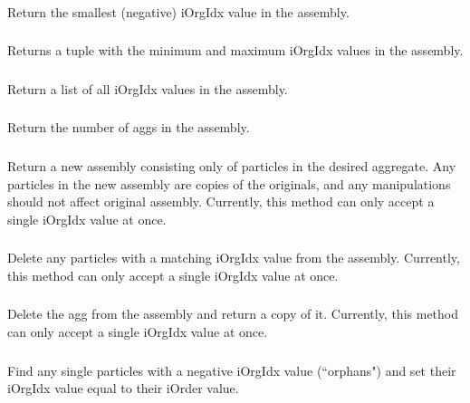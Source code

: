 \subsubsection{}
Return the smallest (negative) iOrgIdx value in the assembly.

\subsubsection{}
Returns a tuple with the minimum and maximum iOrgIdx values in the assembly.

\subsubsection{}
Return a list of all iOrgIdx values in the assembly.

\subsubsection{}
Return the number of aggs in the assembly.

\subsubsection{}
Return a new assembly consisting only of particles in the desired aggregate. Any particles in the new assembly are copies of the originals, and any manipulations should not affect original assembly. Currently, this method can only accept a single iOrgIdx value at once.

\subsubsection{}
Delete any particles with a matching iOrgIdx value from the assembly. Currently, this method can only accept a single iOrgIdx value at once.

\subsubsection{}
Delete the agg from the assembly and return a copy of it. Currently, this method can only accept a single iOrgIdx value at once.

\subsubsection{}
Find any single particles with a negative iOrgIdx value (``orphans") and set their iOrgIdx value equal to their iOrder value.




